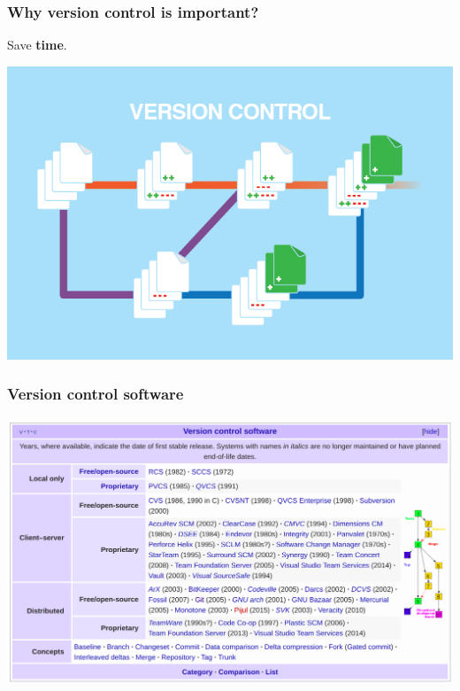 \documentclass[svgnames]{beamer}
\begin{document}
\begin{frame}
\frametitle{Why version control is important?}
Save \textbf{time}.

\begin{center}
\includegraphics[scale=0.35]{img/version-control.png}
\end{center}

\end{frame}


\begin{frame}
\frametitle{Version control software}

\begin{center}
\includegraphics[scale=0.29]{img/controlVersion.png}
\end{center}

\end{frame}
\end{document}
